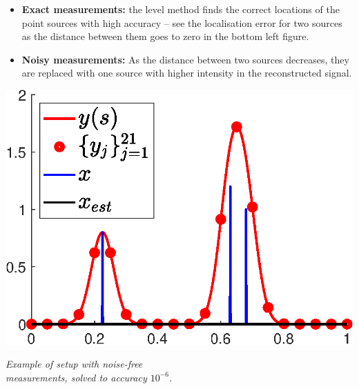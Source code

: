 \documentclass[a0paper,portrait,fontscale=0.35]{baposter}
\newcommand{\mycaption}[1]{
  {
    \smaller
    \emph{#1}
  }
}
\theoremstyle{plain}
\theoremstyle{plain}
\theoremstyle{definition}
\theoremstyle{plain}
\theoremstyle{definition}
\begin{document}
\begin{poster}
{\begin{minipage}[t]{0.51\textwidth}
    \vspace{-1em}
    \begin{minipage}[h]{0.5\textwidth}
      \begin{itemize}
        \item \textbf{Exact measurements:} 
          the level method finds the correct
          locations of the point sources with high
          accuracy -- see the localisation error
          for two sources as the distance between them
          goes to zero in the bottom left figure. 
        \item \textbf{Noisy measurements:}
          As the distance between two sources
          decreases, they are replaced with one source
          with higher intensity in the reconstructed
          signal.
      \end{itemize}
    \end{minipage}
    \begin{minipage}[h]{0.49\textwidth}
      \centering
      \includegraphics[height=0.1\textheight]{img/1d_base.eps}
      
      \mycaption{Example of setup with noise-free\\ 
        measurements, solved to accuracy $10^{-6}$.}
    \end{minipage}
 

\end{minipage}}
\end{poster}
\end{document}
